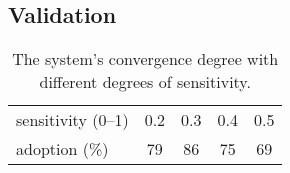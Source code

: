 \subsection{Validation}
\label{subsec:validation}

\begin{table}[t]
	\centering
	\begin{tabularx}{\linewidth}{X*{4}{S[table-format=2.1]}}
		\toprule
		sensitivity (\numrange{0}{1}) &  0.2 &  0.3 &  0.4 &  0.5 \\
		adoption (\si{\percent})      & 79   & 86   & 75   & 69   \\
		\bottomrule
	\end{tabularx}
	\caption{The system's convergence degree with different degrees of sensitivity.}
	\label{tab:validation_baseline}
\end{table}

